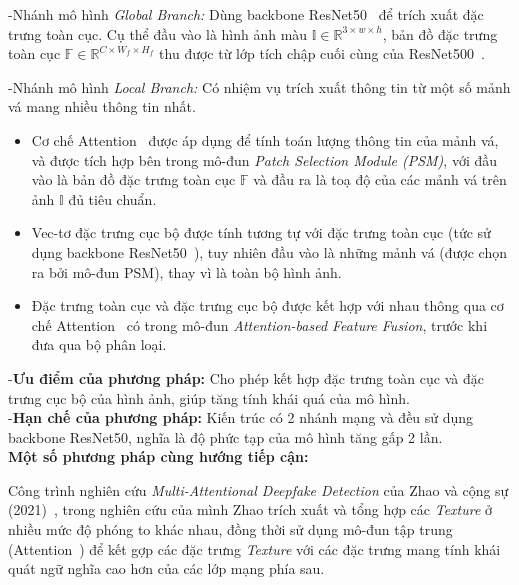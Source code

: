 -Nhánh mô hình \textit{Global Branch:} 
%
Dùng \gls{backbone} ResNet50~\cite{He2015DeepRL} để trích xuất đặc trưng toàn cục. Cụ thể đầu vào là hình ảnh màu $\mathbb{I} \in \mathbb{R}^{3 \times w \times h}$, bản đồ đặc trưng toàn cục $\mathbb{F} \in \mathbb{R}^{C \times W_f \times H_f}$ thu được từ lớp tích chập cuối cùng của ResNet500~\cite{He2015DeepRL}.

-Nhánh mô hình \textit{Local Branch:} Có nhiệm vụ trích xuất thông tin từ một số mảnh vá mang nhiều thông tin nhất.

\begin{itemize}
	\item Cơ chế Attention~\cite{Vaswani2017AttentionIA} được áp dụng để tính toán lượng thông tin của mảnh vá, và được tích hợp bên trong mô-đun \textit{Patch Selection Module (PSM)}, với đầu vào là bản đồ đặc trưng toàn cục $\mathbb{F}$ và đầu ra là toạ độ của các mảnh vá trên ảnh $\mathbb{I}$ đủ tiêu chuẩn.
	\item Vec-tơ đặc trưng cục bộ được tính tương tự với đặc trưng toàn cục (tức sử dụng \gls{backbone} ResNet50~\cite{He2015DeepRL}), tuy nhiên đầu vào là những mảnh vá (được chọn ra bởi mô-đun PSM), thay vì là toàn bộ hình ảnh.
	\item Đặc trưng toàn cục và đặc trưng cục bộ được kết hợp với nhau thông qua cơ chế Attention~\cite{Vaswani2017AttentionIA} có trong mô-đun \textit{Attention-based Feature Fusion}, trước khi đưa qua bộ phân loại.
\end{itemize}
%
-\textbf{Ưu điểm của phương pháp:}
%
Cho phép kết hợp đặc trưng toàn cục và đặc trưng cục bộ của hình ảnh, giúp tăng tính khái quá của mô hình.\\
%
-\textbf{Hạn chế của phương pháp:}
Kiến trúc có 2 nhánh mạng và đều sử dụng \gls{backbone} ResNet50, nghĩa là độ phức tạp của mô hình tăng gấp 2 lần.\\
%
\textbf{Một số phương pháp cùng hướng tiếp cận:}
%

Công trình nghiên cứu \textit{Multi-Attentional Deepfake Detection} của Zhao và cộng sự (2021)~\cite{Zhao_2021_CVPR}, trong nghiên cứu của mình Zhao trích xuất và tổng hợp các \textit{Texture} ở nhiều mức độ phóng to khác nhau, đồng thời sử dụng mô-đun tập trung (Attention~\cite{Vaswani2017AttentionIA}) để kết gợp các đặc trưng \textit{Texture} với các đặc trưng mang tính khái quát ngữ nghĩa cao hơn của các lớp mạng phía sau.

